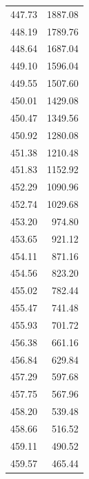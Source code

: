 \begin{table}[!h]
\begin{tabular}{rr}
          447.73 &   1887.08 \\
          448.19 &   1789.76 \\
          448.64 &   1687.04 \\
          449.10 &   1596.04 \\
          449.55 &   1507.60 \\
          450.01 &   1429.08 \\ 
          450.47 &   1349.56 \\
          450.92 &   1280.08 \\
          451.38 &   1210.48 \\
          451.83 &   1152.92 \\
          452.29 &   1090.96 \\
          452.74 &   1029.68 \\
          453.20 &    974.80 \\
          453.65 &    921.12 \\
          454.11 &    871.16 \\
          454.56 &    823.20 \\
          455.02 &    782.44 \\
          455.47 &    741.48 \\
          455.93 &    701.72 \\
          456.38 &    661.16 \\
          456.84 &    629.84 \\
          457.29 &    597.68 \\
          457.75 &    567.96 \\
          458.20 &    539.48 \\
          458.66 &    516.52 \\
          459.11 &    490.52 \\
          459.57 &    465.44 \\
\bottomrule
\end{tabular}
\end{table}
\newpage

